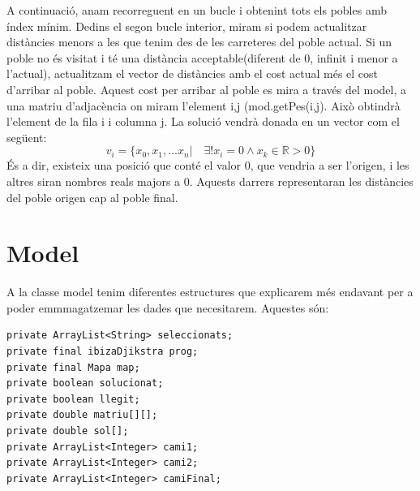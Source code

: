 \documentclass[conference]{IEEEtran}
\begin{document}
            A continuació, anam recorreguent en un bucle i obtenint tots els pobles amb índex mínim. Dedins el segon bucle interior, miram si podem actualitzar distàncies menors a les que tenim des de les carreteres del poble actual. Si un poble no és visitat i té una distància acceptable(diferent de 0, infinit i menor a l'actual), actualitzam el vector de distàncies amb el cost actual més el cost d'arribar al poble. Aquest cost per arribar al poble es mira a través del model, a una matriu d'adjacència on miram l'element i,j (mod.getPes(i,j). Això obtindrà l'element de la fila i i columna j. La solució vendrà donada en un vector com el següent:
            $$v_{i}=\{x_{0},x_{1},...x_{n} |\quad \exists! x_{i}=0 \land x_{k}\in \mathbb{R}>0 \}$$
            És a dir, existeix una posició que conté el valor 0, que vendria a ser l'origen, i les altres siran nombres reals majors a 0. Aquests darrers representaran les distàncies del poble origen cap al poble final.
            
             
\section{Model}
 A la classe model tenim diferentes estructures que explicarem més endavant per a poder emmmagatzemar les dades que necesitarem. Aquestes són:
    \begin{verbatim}
private ArrayList<String> seleccionats;
private final ibizaDjikstra prog;
private final Mapa map;
private boolean solucionat;
private boolean llegit;
private double matriu[][];
private double sol[];
private ArrayList<Integer> cami1;
private ArrayList<Integer> cami2;
private ArrayList<Integer> camiFinal;
    \end{verbatim}
    
\end{document}
